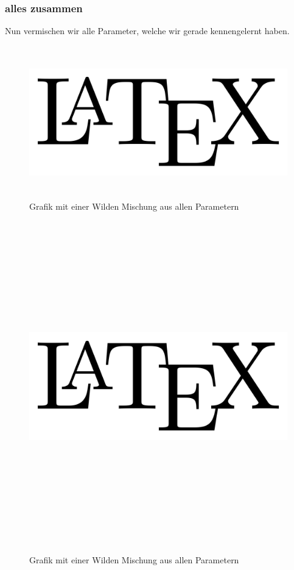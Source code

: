\documentclass[
12pt,
ngerman
]{scrreprt}
\begin{document}
\subsubsection{alles zusammen}
\label{subsubsec:graphics-param-all}
Nun vermischen wir alle Parameter, welche wir gerade kennengelernt haben.
\begin{figure} [hbt!]
  \centering
  \includegraphics[width=0.6\linewidth,height=250px, angle=90]{img/latex-logo}
  \caption{Grafik mit einer Wilden Mischung aus allen Parametern}
  \label{fig:graphics-param-all-1}
\end{figure}
\begin{figure} [hbt!]
  \centering
  \includegraphics[width=0.54821\linewidth,height=541px, angle=4161]{img/latex-logo}
  \caption{Grafik mit einer Wilden Mischung aus allen Parametern}
  \label{fig:graphics-param-all-2}
\end{figure}
\end{document}
